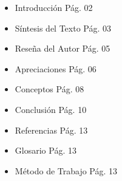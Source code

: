 \vspace{2cm}
\begin{itemize}
	\item Introducci\'on       \hspace{10cm}    P\'ag. 02\\
	\item S\'intesis del Texto \hspace{9.15cm}  P\'ag. 03\\
	\item Rese\~na del Autor   \hspace{9.19cm}  P\'ag. 05\\
	\item Apreciaciones        \hspace{9.83cm}  P\'ag. 06\\
	\item Conceptos            \hspace{10.4cm}  P\'ag. 08\\
	\item Conclusi\'on         \hspace{10.3cm}  P\'ag. 10\\
	\item Referencias          \hspace{10.25cm} P\'ag. 13\\
	\item Glosario             \hspace{10.75cm} P\'ag. 13\\
	\item M\'etodo de Trabajo  \hspace{8.9cm}   P\'ag. 13\\
\end{itemize}
\vspace{5cm}

